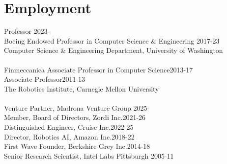 
\section{Employment}
\noindent
Professor \hfill 2023-\phantom{20}\\
Boeing Endowed Professor in Computer Science \& Engineering \hfill 2017-23\\
Computer Science \& Engineering Department, 
University of Washington\\
\\
Finmeccanica Associate Professor in Computer Science\hfill 2013-17\\
Associate Professor\hfill 2011-13\\
The Robotics Institute,  Carnegie Mellon University\\
\\
Venture Partner, Madrona Venture Group \hfill 2025-\phantom{23}\\
Member, Board of Directors, Zordi Inc.\hfill 2021-26\\
Distinguished Engineer, Cruise Inc.\hfill 2022-25\\
Director, Robotics AI, Amazon Inc.\hfill 2018-22\\
First Wave Founder, Berkshire Grey Inc.\hfill 2014-18\\
Senior Research Scientist, Intel Labs Pittsburgh \hfill 2005-11

